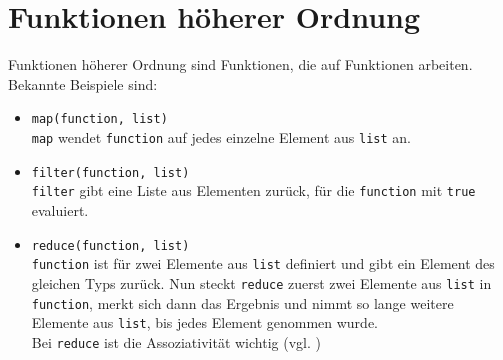 
\section{Funktionen höherer Ordnung}
Funktionen höherer Ordnung sind Funktionen, die auf Funktionen arbeiten.
Bekannte Beispiele sind:
\begin{itemize}
    \item \texttt{map(function, list)}\\
          \texttt{map} wendet \texttt{function} auf jedes einzelne
          Element aus \texttt{list} an.
    \item \texttt{filter(function, list)}\\
          \texttt{filter} gibt eine Liste aus Elementen zurück, für 
          die \texttt{function} mit \texttt{true} evaluiert.
    \item \texttt{reduce(function, list)}\\
          \texttt{function} ist für zwei Elemente aus \texttt{list}
          definiert und gibt ein Element des gleichen Typs zurück.
          Nun steckt \texttt{reduce} zuerst zwei Elemente aus \texttt{list}
          in \texttt{function}, merkt sich dann das Ergebnis und nimmt
          so lange weitere Elemente aus \texttt{list}, bis jedes 
          Element genommen wurde.\\
          Bei \texttt{reduce} ist die Assoziativität wichtig (vgl. )
\end{itemize}
